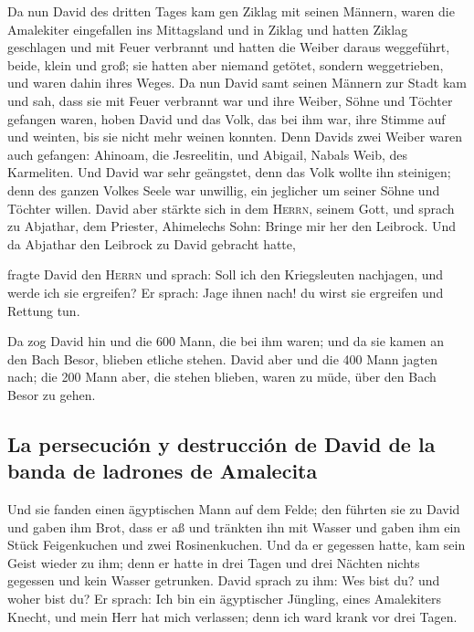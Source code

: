  Da nun David des dritten Tages kam gen Ziklag mit seinen
Männern, waren die Amalekiter eingefallen ins Mittagsland und in Ziklag
und hatten Ziklag geschlagen und mit Feuer verbrannt  und
hatten die Weiber daraus weggeführt, beide, klein und groß; sie hatten
aber niemand getötet, sondern weggetrieben, und waren dahin ihres Weges.
 Da nun David samt seinen Männern zur Stadt kam und sah,
dass sie mit Feuer verbrannt war und ihre Weiber, Söhne und Töchter
gefangen waren,  hoben David und das Volk, das bei ihm
war, ihre Stimme auf und weinten, bis sie nicht mehr weinen konnten.
 Denn Davids zwei Weiber waren auch gefangen: Ahinoam, die
Jesreelitin, und Abigail, Nabals Weib, des Karmeliten. 
Und David war sehr geängstet, denn das Volk wollte ihn steinigen; denn
des ganzen Volkes Seele war unwillig, ein jeglicher um seiner Söhne und
Töchter willen. David aber stärkte sich in dem \textsc{Herrn}, seinem
Gott,  und sprach zu Abjathar, dem Priester, Ahimelechs
Sohn: Bringe mir her den Leibrock. Und da Abjathar den Leibrock zu David
gebracht hatte,

 fragte David den \textsc{Herrn} und sprach: Soll ich den
Kriegsleuten nachjagen, und werde ich sie ergreifen? Er sprach: Jage
ihnen nach! du wirst sie ergreifen und Rettung tun.

 Da zog David hin und die 600 Mann, die bei ihm waren; und
da sie kamen an den Bach Besor, blieben etliche stehen. 
David aber und die 400 Mann jagten nach; die 200 Mann aber, die stehen
blieben, waren zu müde, über den Bach Besor zu gehen.

\hypertarget{la-persecuciuxf3n-y-destrucciuxf3n-de-david-de-la-banda-de-ladrones-de-amalecita}{%
\subsection{La persecución y destrucción de David de la banda de
ladrones de
Amalecita}\label{la-persecuciuxf3n-y-destrucciuxf3n-de-david-de-la-banda-de-ladrones-de-amalecita}}

 Und sie fanden einen ägyptischen Mann auf dem Felde; den
führten sie zu David und gaben ihm Brot, dass er aß und tränkten ihn mit
Wasser  und gaben ihm ein Stück Feigenkuchen und zwei
Rosinenkuchen. Und da er gegessen hatte, kam sein Geist wieder zu ihm;
denn er hatte in drei Tagen und drei Nächten nichts gegessen und kein
Wasser getrunken.  David sprach zu ihm: Wes bist du? und
woher bist du? Er sprach: Ich bin ein ägyptischer Jüngling, eines
Amalekiters Knecht, und mein Herr hat mich verlassen; denn ich ward
krank vor drei Tagen.

